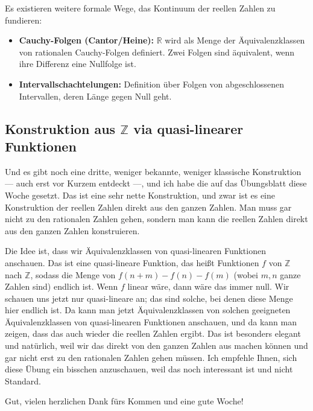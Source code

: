 \begin{math-stroke}
Es existieren weitere formale Wege, das Kontinuum der reellen Zahlen zu fundieren:
\begin{itemize}
    \item \textbf{Cauchy-Folgen (Cantor/Heine):} $\mathbb{R}$ wird als Menge der Äquivalenzklassen von rationalen Cauchy-Folgen definiert. Zwei Folgen sind äquivalent, wenn ihre Differenz eine Nullfolge ist.
    \item \textbf{Intervallschachtelungen:} Definition über Folgen von abgeschlossenen Intervallen, deren Länge gegen Null geht.
\end{itemize}
\end{math-stroke}

\subsection{Konstruktion aus \texorpdfstring{$\mathbb{Z}$}{Z} via quasi-linearer Funktionen}

\begin{spoken-clean}[01:21:10 - 01:21:17]
Und es gibt noch eine dritte, weniger bekannte, weniger klassische Konstruktion --- auch erst vor Kurzem entdeckt ---, und ich habe die auf das Übungsblatt diese Woche gesetzt. Das ist eine sehr nette Konstruktion, und zwar ist es eine Konstruktion der reellen Zahlen direkt aus den ganzen Zahlen. Man muss gar nicht zu den rationalen Zahlen gehen, sondern man kann die reellen Zahlen direkt aus den ganzen Zahlen konstruieren.

Die Idee ist, dass wir Äquivalenzklassen von quasi-linearen Funktionen anschauen. Das ist eine quasi-lineare Funktion, das heißt Funktionen $f$ von $\mathbb{Z}$ nach $\mathbb{Z}$, sodass die Menge von $f(n+m) - f(n) - f(m)$ (wobei $m, n$ ganze Zahlen sind) endlich ist. Wenn $f$ linear wäre, dann wäre das immer null. Wir schauen uns jetzt nur quasi-lineare an; das sind solche, bei denen diese Menge hier endlich ist. Da kann man jetzt Äquivalenzklassen von solchen geeigneten Äquivalenzklassen von quasi-linearen Funktionen anschauen, und da kann man zeigen, dass das auch wieder die reellen Zahlen ergibt. Das ist besonders elegant und natürlich, weil wir das direkt von den ganzen Zahlen aus machen können und gar nicht erst zu den rationalen Zahlen gehen müssen. Ich empfehle Ihnen, sich diese Übung ein bisschen anzuschauen, weil das noch interessant ist und nicht Standard.

Gut, vielen herzlichen Dank fürs Kommen und eine gute Woche!
\end{spoken-clean}

